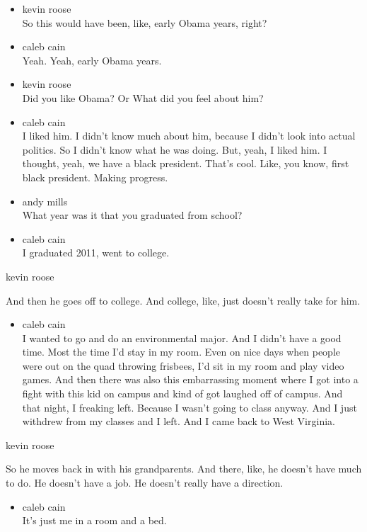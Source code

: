 \begin{itemize}
\item
  kevin roose\\
  So this would have been, like, early Obama years, right?
\item
  caleb cain\\
  Yeah. Yeah, early Obama years.
\item
  kevin roose\\
  Did you like Obama? Or What did you feel about him?
\item
  caleb cain\\
  I liked him. I didn't know much about him, because I didn't look into
  actual politics. So I didn't know what he was doing. But, yeah, I
  liked him. I thought, yeah, we have a black president. That's cool.
  Like, you know, first black president. Making progress.
\item
  andy mills\\
  What year was it that you graduated from school?
\item
  caleb cain\\
  I graduated 2011, went to college.
\end{itemize}

kevin roose

And then he goes off to college. And college, like, just doesn't really
take for him.

\begin{itemize}
\tightlist
\item
  caleb cain\\
  I wanted to go and do an environmental major. And I didn't have a good
  time. Most the time I'd stay in my room. Even on nice days when people
  were out on the quad throwing frisbees, I'd sit in my room and play
  video games. And then there was also this embarrassing moment where I
  got into a fight with this kid on campus and kind of got laughed off
  of campus. And that night, I freaking left. Because I wasn't going to
  class anyway. And I just withdrew from my classes and I left. And I
  came back to West Virginia.
\end{itemize}

kevin roose

So he moves back in with his grandparents. And there, like, he doesn't
have much to do. He doesn't have a job. He doesn't really have a
direction.

\begin{itemize}
\tightlist
\item
  caleb cain\\
  It's just me in a room and a bed.
\end{itemize}

